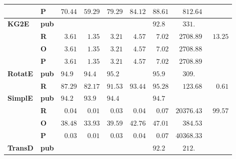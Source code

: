 \begin{tabular}{llrrrrrrr}
       & \textbf{P} &            $70.44$ &            $59.29$ &            $79.29$ &            $84.12$ &            $88.61$ &            $\phantom{00}812.64$ &                     \\\midrule
\textbf{KG2E} & \textbf{pub} &                    &                    &                    &                    &  $92.8\phantom{0}$ &  $\phantom{00}331.\phantom{00}$ &                     \\
       & \textbf{R} &  $\phantom{0}3.61$ &  $\phantom{0}1.35$ &  $\phantom{0}3.21$ &  $\phantom{0}4.57$ &  $\phantom{0}7.02$ &            $\phantom{0}2708.89$ &  $\phantom{0}13.25$ \\
       & \textbf{O} &  $\phantom{0}3.61$ &  $\phantom{0}1.35$ &  $\phantom{0}3.21$ &  $\phantom{0}4.57$ &  $\phantom{0}7.02$ &            $\phantom{0}2708.88$ &                     \\
       & \textbf{P} &  $\phantom{0}3.61$ &  $\phantom{0}1.35$ &  $\phantom{0}3.21$ &  $\phantom{0}4.57$ &  $\phantom{0}7.02$ &            $\phantom{0}2708.89$ &                     \\\midrule
\textbf{RotatE} & \textbf{pub} &  $94.9\phantom{0}$ &  $94.4\phantom{0}$ &  $95.2\phantom{0}$ &                    &  $95.9\phantom{0}$ &  $\phantom{00}309.\phantom{00}$ &                     \\
       & \textbf{R} &            $87.29$ &            $82.17$ &            $91.53$ &            $93.44$ &            $95.28$ &            $\phantom{00}123.68$ &  $\phantom{00}0.61$ \\\midrule
\textbf{SimplE} & \textbf{pub} &  $94.2\phantom{0}$ &  $93.9\phantom{0}$ &  $94.4\phantom{0}$ &                    &  $94.7\phantom{0}$ &                                 &                     \\
       & \textbf{R} &  $\phantom{0}0.04$ &  $\phantom{0}0.01$ &  $\phantom{0}0.03$ &  $\phantom{0}0.04$ &  $\phantom{0}0.07$ &                      $20376.43$ &  $\phantom{0}99.57$ \\
       & \textbf{O} &            $38.48$ &            $33.93$ &            $39.59$ &            $42.76$ &            $47.01$ &            $\phantom{00}384.53$ &                     \\
       & \textbf{P} &  $\phantom{0}0.03$ &  $\phantom{0}0.01$ &  $\phantom{0}0.03$ &  $\phantom{0}0.04$ &  $\phantom{0}0.07$ &                      $40368.33$ &                     \\\midrule
\textbf{TransD} & \textbf{pub} &                    &                    &                    &                    &  $92.2\phantom{0}$ &  $\phantom{00}212.\phantom{00}$ &                     \\

\end{tabular}

